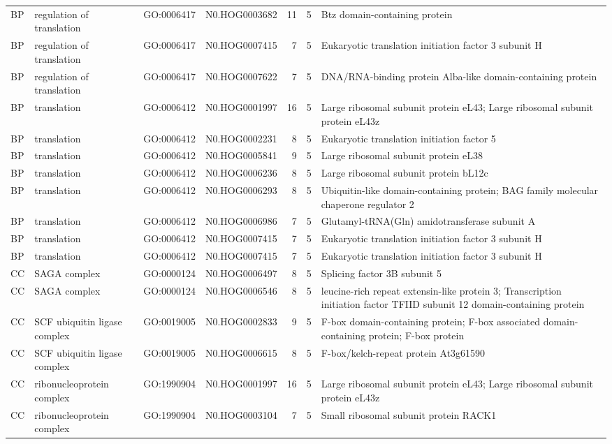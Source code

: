 \begin{table}
\begin{tabular}[t]{llllrrl}
BP & regulation of translation & GO:0006417 & N0.HOG0003682 & 11 & 5 & Btz domain-containing protein\\
BP & regulation of translation & GO:0006417 & N0.HOG0007415 & 7 & 5 & Eukaryotic translation initiation factor 3 subunit H\\
BP & regulation of translation & GO:0006417 & N0.HOG0007622 & 7 & 5 & DNA/RNA-binding protein Alba-like domain-containing protein\\
BP & translation & GO:0006412 & N0.HOG0001997 & 16 & 5 & Large ribosomal subunit protein eL43; Large ribosomal subunit protein eL43z\\
BP & translation & GO:0006412 & N0.HOG0002231 & 8 & 5 & Eukaryotic translation initiation factor 5\\
BP & translation & GO:0006412 & N0.HOG0005841 & 9 & 5 & Large ribosomal subunit protein eL38\\
BP & translation & GO:0006412 & N0.HOG0006236 & 8 & 5 & Large ribosomal subunit protein bL12c\\
BP & translation & GO:0006412 & N0.HOG0006293 & 8 & 5 & Ubiquitin-like domain-containing protein; BAG family molecular chaperone regulator 2\\
BP & translation & GO:0006412 & N0.HOG0006986 & 7 & 5 & Glutamyl-tRNA(Gln) amidotransferase subunit A\\
BP & translation & GO:0006412 & N0.HOG0007415 & 7 & 5 & Eukaryotic translation initiation factor 3 subunit H\\
BP & translation & GO:0006412 & N0.HOG0007415 & 7 & 5 & Eukaryotic translation initiation factor 3 subunit H\\
CC & SAGA complex & GO:0000124 & N0.HOG0006497 & 8 & 5 & Splicing factor 3B subunit 5\\
CC & SAGA complex & GO:0000124 & N0.HOG0006546 & 8 & 5 & leucine-rich repeat extensin-like protein 3; Transcription initiation factor TFIID subunit 12 domain-containing protein\\
CC & SCF ubiquitin ligase complex & GO:0019005 & N0.HOG0002833 & 9 & 5 & F-box domain-containing protein; F-box associated domain-containing protein; F-box protein\\
CC & SCF ubiquitin ligase complex & GO:0019005 & N0.HOG0006615 & 8 & 5 & F-box/kelch-repeat protein At3g61590\\
CC & ribonucleoprotein complex & GO:1990904 & N0.HOG0001997 & 16 & 5 & Large ribosomal subunit protein eL43; Large ribosomal subunit protein eL43z\\
CC & ribonucleoprotein complex & GO:1990904 & N0.HOG0003104 & 7 & 5 & Small ribosomal subunit protein RACK1\\

\end{tabular}
\end{table}
